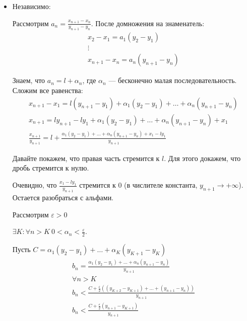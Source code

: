 \documentclass[14pt]{extarticle}
\numberwithin{equation}{section}
\begin{document}
\begin{itemize}
            \newpage
        \item
            Независимо:

            Рассмотрим \( a_n = \frac{x_{n + 1} - x_n}{y_{n + 1} - y_n} \).
            После домножения на знаменатель:
            \begin{gather*}
                x_2 - x_1 = a_1 (y_2 - y_1)
                \\
                \vdots
                \\
                x_{n + 1} - x_n = a_n (y_{n + 1} - y_n)
            \end{gather*}

            Знаем, что \( a_n = l + \alpha_n \), где \( \alpha_n \) --- бесконечно малая последовательность.
            Сложим все равенства:
            \begin{gather*}
                x_{n + 1} - x_1 = l (y_{n + 1} - y_1) + \alpha_1 (y_2 - y_1) + \ldots + \alpha_n (y_{n + 1} - y_n)
                \\
                x_{n + 1} = l y_{n + 1} - l y_1 + \alpha_1 (y_2 - y_1) + \ldots + \alpha_n (y_{n + 1} - y_n) + x_1
                \\
                \frac{x_{n + 1}}{y_{n + 1}}
                    = l + \frac{\alpha_1 (y_2 - y_1) + \ldots + \alpha_n (y_{n + 1} - y_n) + x_1 - l y_1}{y_{n + 1}}
            \end{gather*}

            Давайте покажем, что правая часть стремится к \( l \).
            Для этого докажем, что дробь стремится к нулю.

            Очевидно, что \( \frac{x_1 - l y_1}{y_{n + 1}} \) стремится к \( 0 \)
            (в числителе константа, \( y_{n + 1} \to +\infty \)).
            Остается разобраться с альфами.

            Рассмотрим \( \varepsilon > 0 \)

            \( \exists K : \forall n > K \ 0 < \alpha_n < \frac{\varepsilon}{2} \).

            Пусть \( C = \alpha_1 (y_2 - y_1) + \ldots + \alpha_K (y_{K + 1} - y_K) \)
            \begin{gather*}
                b_n = \frac{\alpha_1 (y_2 - y_1) + \ldots + \alpha_n (y_{n + 1} - y_n)}{y_{n + 1}}
                \\
                \forall n > K
                \\
                b_n < \frac{C + \frac{\varepsilon}{2} ((y_{K + 2} - y_{K + 1}) + \ldots + (y_{n + 1} - y_n))}{y_{n + 1}}
                \\
                b_n < \frac{C + \frac{\varepsilon}{2} (y_{n + 1} - y_{K + 1})}{y_{n + 1}}
            \end{gather*}


\end{itemize}
\end{document}
